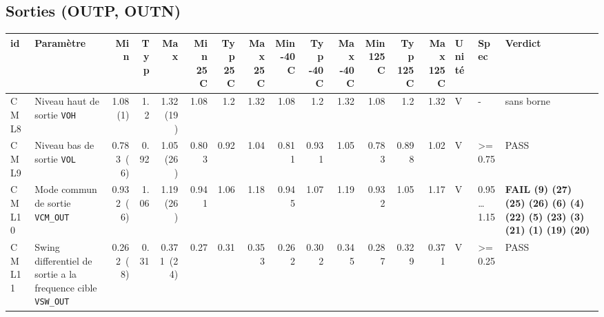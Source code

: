 \documentclass[a4paper,10pt,landscape]{article}
\begin{document}
\subsection*{Sorties (OUTP, OUTN)}
{\footnotesize\setlength{\tabcolsep}{3pt}\begin{longtable}{lp{46mm}rrrrrrrrrrrrlp{24mm}p{19mm}}\toprule
id & Param\`etre & Min & Typ & Max & {\tiny Min 25 C} & {\tiny Typ 25 C} & {\tiny Max 25 C} & {\tiny Min -40 C} & {\tiny Typ -40 C} & {\tiny Max -40 C} & {\tiny Min 125 C} & {\tiny Typ 125 C} & {\tiny Max 125 C} & Unit\'e & Spec & Verdict \\ \midrule\endhead
CML8 & Niveau haut de sortie {\tiny\texttt{VOH}} & 1.08~(1) & 1.2 & 1.32~(19) & 1.08 & 1.2 & 1.32 & 1.08 & 1.2 & 1.32 & 1.08 & 1.2 & 1.32 & V & - & sans borne \\
CML9 & Niveau bas de sortie {\tiny\texttt{VOL}} & 0.783~(6) & 0.92 & 1.05~(26) & 0.803 & 0.92 & 1.04 & 0.811 & 0.931 & 1.05 & 0.783 & 0.898 & 1.02 & V & \textgreater{}= 0.75 & PASS \\
CML10 & Mode commun de sortie {\tiny\texttt{VCM\_OUT}} & 0.932~(6) & 1.06 & 1.19~(26) & 0.941 & 1.06 & 1.18 & 0.945 & 1.07 & 1.19 & 0.932 & 1.05 & 1.17 & V & 0.95 \ldots{} 1.15 & \textbf{FAIL (9) (27) (25) (26) (6) (4) (22) (5) (23) (3) (21) (1) (19) (20)} \\
CML11 & Swing differentiel de sortie a la frequence cible {\tiny\texttt{VSW\_OUT}} & 0.262~(8) & 0.31 & 0.371~(24) & 0.27 & 0.31 & 0.353 & 0.262 & 0.302 & 0.345 & 0.287 & 0.329 & 0.371 & V & \textgreater{}= 0.25 & PASS \\
\bottomrule\end{longtable}}
\end{document}
